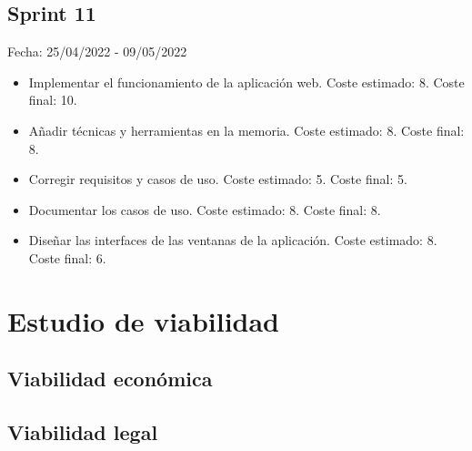 \subsection{Sprint 11}
Fecha: 25/04/2022 - 09/05/2022
\begin{itemize}
	\item Implementar el funcionamiento de la aplicación web. Coste estimado: 8. Coste final: 10.
	\item Añadir técnicas y herramientas en la memoria. Coste estimado: 8. Coste final: 8.
	\item Corregir requisitos y casos de uso. Coste estimado: 5. Coste final: 5.
	\item Documentar los casos de uso. Coste estimado: 8. Coste final: 8.
	\item Diseñar las interfaces de las ventanas de la aplicación. Coste estimado: 8. Coste final: 6.
\end{itemize}

\section{Estudio de viabilidad}

\subsection{Viabilidad económica}

\subsection{Viabilidad legal}
